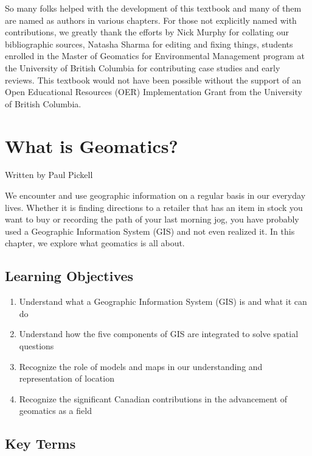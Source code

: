 \documentclass[
]{book}
\providecommand{\tightlist}{%
  \setlength{\itemsep}{0pt}\setlength{\parskip}{0pt}}
\begin{document}
So many folks helped with the development of this textbook and many of them are named as authors in various chapters. For those not explicitly named with contributions, we greatly thank the efforts by Nick Murphy for collating our bibliographic sources, Natasha Sharma for editing and fixing things, students enrolled in the Master of Geomatics for Environmental Management program at the University of British Columbia for contributing case studies and early reviews. This textbook would not have been possible without the support of an Open Educational Resources (OER) Implementation Grant from the University of British Columbia.

\chapter{What is Geomatics?}\label{what-is-geomatics}

Written by
Paul Pickell

We encounter and use geographic information on a regular basis in our everyday lives. Whether it is finding directions to a retailer that has an item in stock you want to buy or recording the path of your last morning jog, you have probably used a Geographic Information System (GIS) and not even realized it. In this chapter, we explore what geomatics is all about.

\section*{Learning Objectives}\label{learning-objectives}

\begin{enumerate}
\def\labelenumi{\arabic{enumi}.}
\tightlist
\item
  Understand what a Geographic Information System (GIS) is and what it can do
\item
  Understand how the five components of GIS are integrated to solve spatial questions
\item
  Recognize the role of models and maps in our understanding and representation of location
\item
  Recognize the significant Canadian contributions in the advancement of geomatics as a field
\end{enumerate}

\section*{Key Terms}\label{key-terms}
\end{document}
